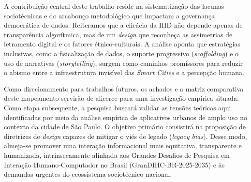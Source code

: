 \documentclass[12pt]{article}
\begin{document}
{{    A contribuição central deste trabalho reside na sistematização das lacunas sociotécnicas e do arcabouço metodológico que impactam a governança democrática de dados. Reiteramos que a eficácia da IHD não depende apenas de transparência algorítmica, mas de um \textit{design} que reconheça as assimetrias de letramento digital e os fatores étnico-culturais. A análise aponta que estratégias inclusivas, como a fisicalização de dados, o suporte progressivo (\textit{scaffolding}) e o uso de narrativas (\textit{storytelling}), surgem como caminhos promissores para reduzir o abismo entre a infraestrutura invisível das \textit{Smart Cities} e a percepção humana.

    Como direcionamento para trabalhos futuros, os achados e a matriz comparativa deste mapeamento servirão de alicerce para uma investigação empírica situada. Como etapa subsequente, a pesquisa buscará validar as tensões teóricas aqui identificadas por meio da análise empírica de aplicativos urbanos de amplo uso no contexto da cidade de São Paulo. O objetivo primário consistirá na proposição de diretrizes de \textit{design} capazes de mitigar o viés de legado (\textit{legacy bias}). Desse modo, almeja-se promover uma interação informacional mais equitativa, transparente e humanizada, intrinsecamente alinhada aos Grandes Desafios de Pesquisa em Interação Humano-Computador no Brasil (GranDIHC-BR-2025-2035) e às demandas urgentes do ecossistema sociotécnico nacional.



}}
\end{document}
